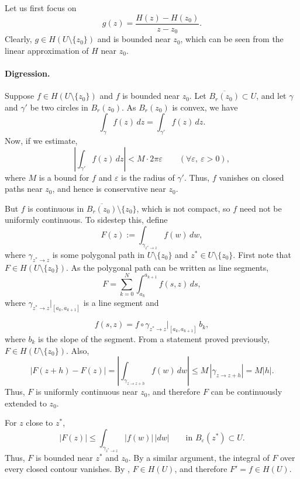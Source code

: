 \documentclass[11pt,a4paper]{article}
\begin{document}

Let us first focus on
\[
  g(z)=\frac{H(z)-H(z_0)}{z-z_0}.
\]
Clearly, \(g\in H(U\setminus\{z_0\})\) and is bounded near \(z_0\), which can be seen from the linear approximation of \(H\) near \(z_0\).

\paragraph{Digression.}
Suppose \(f\in H(U\setminus\{z_0\})\) and \(f\) is bounded near \(z_0\). Let \(\overline{B_r(z_0)}\subset U\), and let \(\gamma\) and \(\gamma'\) be two circles in \(B_r(z_0)\). As \(B_r(z_0)\) is convex, we have
\[
  \int_\gamma f(z)\,dz=\int_{\gamma'} f(z)\,dz.
\]
Now, if we estimate,
\[
  \left|\int_{\gamma'} f(z)\,dz\right|<M\cdot2\pi\varepsilon
  \qquad(\forall\varepsilon,\ \varepsilon>0),
\]
where \(M\) is a bound for \(f\) and \(\varepsilon\) is the radius of \(\gamma'\). Thus, \(f\) vanishes on closed paths near \(z_0\), and hence is conservative near \(z_0\).

But \(f\) is continuous in \(\overline{B_r(z_0)}\setminus\{z_0\}\), which is not compact, so \(f\) need not be uniformly continuous. To sidestep this, define
\[
  F(z):=\int_{\gamma_{z^*\to z}} f(w)\,dw,
\]
where \(\gamma_{z^*\to z}\) is some polygonal path in \(U\setminus\{z_0\}\) and \(z^*\in U\setminus\{z_0\}\). First note that \(F\in H(U\setminus\{z_0\})\). As the polygonal path can be written as line segments,
\[
  F=\sum_{k=0}^{N}\int_{a_k}^{a_{k+1}} f(s,z)\,ds,
\]
where \(\gamma_{z^*\to z}|_{[a_k,a_{k+1}]}\) is a line segment and

\[
  f(s,z)=f\circ\gamma_{z^*\to z}|_{[a_k,a_{k+1}]}\,b_k,
\]
where \(b_k\) is the slope of the segment. From a statement proved previously, \(F\in H(U\setminus\{z_0\})\). Also,
\[
  |F(z+h)-F(z)|
  =\left|\int_{\gamma_{z\to z+h}}f(w)\,dw\right|
  \le M\,|\gamma_{z\to z+h}|=M|h|.
\]
Thus, \(F\) is uniformly continuous near \(z_0\), and therefore \(F\) can be continuously extended to \(z_0\).


For \(z\) close to \(z^*\),
\[
  |F(z)|\le \int_{\gamma_{z^*\to z}}|f(w)|\,|dw|
  \qquad\text{in }B_\varepsilon(z^*)\subset U.
\]
Thus, \(F\) is bounded near \(z^*\) and \(z_0\). By a similar argument, the integral of \(F\) over every closed contour vanishes. By , \(F\in H(U)\), and therefore \(F'=f\in H(U)\).
\end{document}
